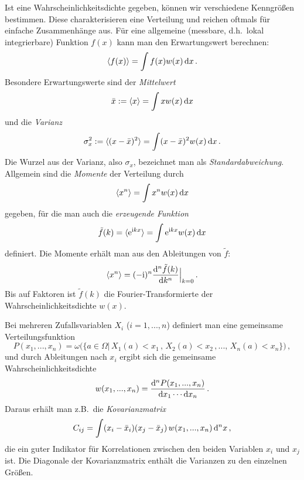 Ist eine Wahrscheinlichkeitsdichte gegeben,
k\"onnen wir verschiedene Kenngr\"o\ss en
bestimmen. Diese charakterisieren eine
Verteilung und reichen oftmals f\"ur einfache
Zusammenh\"ange aus. F\"ur eine allgemeine
(messbare, d.h.\ lokal integrierbare) Funktion $f(x)$ kann man den 
Erwartungswert berechnen:
\begin{equation}
     \langle f(x) \rangle = \int f(x) w(x)\, {\rm d}x \, .
\end{equation}
Besondere Erwartungswerte sind der
{\em Mittelwert}
\begin{equation}
     \bar{x} := \langle x \rangle =  \int x w(x)\, {\rm d}x 
\end{equation}
und die {\em Varianz}
\begin{equation}
     \sigma_x^2 := \langle (x - \bar{x})^2  \rangle 
     = \int (x-\bar{x})^2 w(x)\, {\rm d}x \, .
\end{equation}
Die Wurzel aus der Varianz, also $\sigma_x$, 
bezeichnet man
als {\em Standardabweichung}.
Allgemein sind die {\em Momente}
der Verteilung durch
\begin{equation}
     \langle x^n \rangle = \int x^n w(x)\, {\rm d}x 
\end{equation}
gegeben, f\"ur die man auch die {\em erzeugende
Funktion}
\begin{equation}
     \tilde{f}(k) = \langle {\rm e}^{{\rm i}kx} \rangle = \int 
     {\rm e}^{{\rm i}kx} w(x)\, {\rm d}x 
\end{equation}
definiert. Die Momente erh\"alt man aus den 
Ableitungen von $\tilde{f}$:
\begin{equation}
     \langle x^n \rangle = (-{\rm i})^n \frac{{\rm d}^n \tilde{f}(k)}{{\rm d}k^n}
     \Big|_{k=0} \, .
\end{equation}
Bis auf Faktoren ist $\tilde{f}(k)$ die Fourier-Transformierte
der Wahrscheinlichkeitsdichte $w(x)$. 

Bei mehreren Zufallsvariablen $X_i$ ($i=1,...,n$) 
definiert man eine gemeinsame Verteilungsfunktion
\begin{equation}
     P(x_1,...,x_n) = \omega \Big( \{ a \in \Omega | \,
       X_1(a)<x_1 \, , \, X_2(a)<x_2 \, , ..., \, X_n(a)<x_n\} \Big)  \, ,
\end{equation}
und durch Ableitungen nach $x_i$ ergibt sich die 
gemeinsame Wahrscheinlichkeitsdichte
\begin{equation}
    w(x_1,...,x_n) = \frac{{\rm d}^n P(x_1,...,x_n)}{{\rm d}x_1 \cdots {\rm d}x_n} \, .
\end{equation}
Daraus erh\"alt man z.B.\ die {\em Kovarianzmatrix}
\begin{equation}
     C_{ij} = \int (x_i - \bar{x}_i)(x_j - \bar{x}_j) \, w(x_1,...,x_n)\, {\rm d}^n x \, ,
\end{equation}
die ein guter Indikator f\"ur Korrelationen zwischen den
beiden Variablen $x_i$ und $x_j$ ist. Die Diagonale der
Kovarianzmatrix enth\"alt die Varianzen zu den einzelnen
Gr\"o\ss en.

